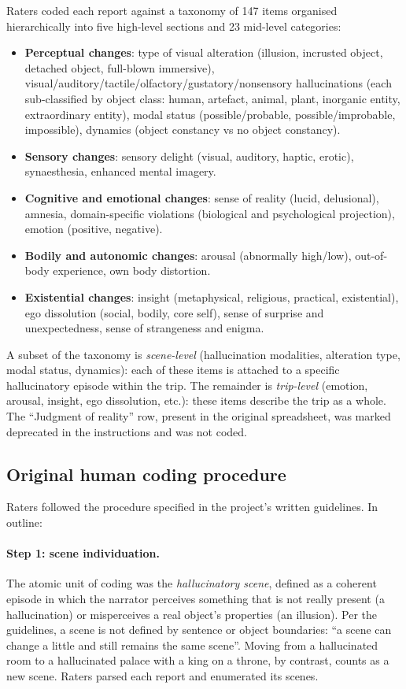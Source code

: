 Raters coded each report against a taxonomy of 147 items organised hierarchically into five high-level sections and 23 mid-level categories:

\begin{itemize}[itemsep=2pt]
\item \textbf{Perceptual changes}: type of visual alteration (illusion, incrusted object, detached object, full-blown immersive), visual/auditory/tactile/olfactory/gustatory/nonsensory hallucinations (each sub-classified by object class: human, artefact, animal, plant, inorganic entity, extraordinary entity), modal status (possible/probable, possible/improbable, impossible), dynamics (object constancy vs no object constancy).
\item \textbf{Sensory changes}: sensory delight (visual, auditory, haptic, erotic), synaesthesia, enhanced mental imagery.
\item \textbf{Cognitive and emotional changes}: sense of reality (lucid, delusional), amnesia, domain-specific violations (biological and psychological projection), emotion (positive, negative).
\item \textbf{Bodily and autonomic changes}: arousal (abnormally high/low), out-of-body experience, own body distortion.
\item \textbf{Existential changes}: insight (metaphysical, religious, practical, existential), ego dissolution (social, bodily, core self), sense of surprise and unexpectedness, sense of strangeness and enigma.
\end{itemize}

A subset of the taxonomy is \emph{scene-level} (hallucination modalities, alteration type, modal status, dynamics): each of these items is attached to a specific hallucinatory episode within the trip. The remainder is \emph{trip-level} (emotion, arousal, insight, ego dissolution, etc.): these items describe the trip as a whole. The ``Judgment of reality'' row, present in the original spreadsheet, was marked deprecated in the instructions and was not coded.

\subsection{Original human coding procedure}
\label{sec:human-coding}

Raters followed the procedure specified in the project's written guidelines. In outline:

\paragraph{Step 1: scene individuation.} The atomic unit of coding was the \emph{hallucinatory scene}, defined as a coherent episode in which the narrator perceives something that is not really present (a hallucination) or misperceives a real object's properties (an illusion). Per the guidelines, a scene is not defined by sentence or object boundaries: ``a scene can change a little and still remains the same scene''. Moving from a hallucinated room to a hallucinated palace with a king on a throne, by contrast, counts as a new scene. Raters parsed each report and enumerated its scenes.

